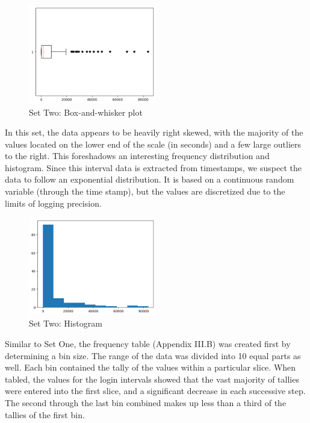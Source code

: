 \documentclass[10pt]{report}
\begin{document}
\begin{figure}
    \centering
    \includegraphics[width=0.50\textwidth]{results/logininterval_boxplot}
    \caption{Set Two: Box-and-whisker plot}
\end{figure}

In this set, the data appears to be heavily right skewed, with the majority of the values located on the lower
end of the scale (in seconds) and a few large outliers to the right. This foreshadows an interesting frequency
distribution and histogram. Since this interval data is extracted from timestamps, we suspect the data to follow an
exponential distribution. It is based on a continuous random variable (through the time stamp), but the values are
discretized due to the limits of logging precision.

\begin{figure}
    \centering
    \includegraphics[width=0.50\textwidth]{results/logininterval_histogram}
    \caption{Set Two: Histogram}
\end{figure}

Similar to Set One, the frequency table (Appendix III.B) was created first by determining a bin size. The range of the data was
divided into 10 equal parts as well. Each bin contained the tally of the values within a particular slice.
When tabled, the values for the login intervals showed that the vast majority
of tallies were entered into the first slice, and a significant decrease in each successive step. The second
through the last bin combined makes up less than a third of the tallies of the first bin.
\end{document}

